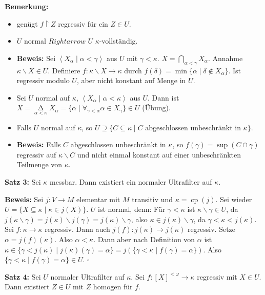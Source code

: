 \documentclass[a4paper,fontsize=11pt]{scrartcl}
\DeclareMathOperator*{\bigdelta}{\Delta}
\newcommand{\cp}{\operatorname{cp}}
\begin{document}
{\bf Bemerkung:}
\begin{itemize}
  \item[(1)] genügt $f\upharpoonright Z$ regressiv für ein $Z\in U$.
  \item[(2)] $U$ normal $Rightarrow$ $U$ $\kappa$-vollständig.
  \item[] {\bf Beweis:} Sei $\left<X_\alpha\mid\alpha<\gamma\right>$
    aus $U$ mit
    $\gamma<\kappa$. $X=\bigcap_{\alpha<\gamma}X_\alpha$. Annahme
    $\kappa\backslash X\in U$. Definiere $f:\kappa\backslash
    X\rightarrow\kappa$ durch $f(\delta)=\min\{\alpha\mid\delta\not\in
    X_\alpha\}$. Ist regressiv modulo $U$, aber nicht konstant auf
    Menge in $U$.
  \item[(3)] Sei $U$ normal auf $\kappa$,
    $\left<X_\alpha\mid\alpha<\kappa\right>$ aus $U$. Dann ist
    $X=\bigdelta\limits_{\alpha<\kappa}X_\alpha=\{\alpha\mid\forall_{\gamma<\alpha}
    \alpha\in X_\gamma\} \in U$ (Übung).
  \item[(4)] Falls $U$ normal auf $\kappa$, so
    $U\supseteq\{C\subseteq\kappa\mid C\mbox{ abgeschlossen
    unbeschränkt in }\kappa\}$.
  \item[] {\bf Beweis:} Falls $C$ abgeschlossen unbeschränkt in
    $\kappa$, so $f(\gamma)=\sup(C\cap\gamma)$ regressiv auf
    $\kappa\backslash C$ und nicht einmal konstant auf einer
    unbeschränkten Teilmenge von $\kappa$.
\end{itemize}

{\bf Satz 3:} Sei $\kappa$ messbar. Dann existiert ein normaler
Ultrafilter auf $\kappa$.

{\bf Beweis:} Sei $j:V\rightarrow M$ elementar mit $M$ transitiv und
$\kappa=\cp(j)$. Sei wieder $U=\{X\subseteq\kappa\mid\kappa\in
j(X)\}$. $U$ ist normal, denn: Für $\gamma<\kappa$ ist
$\kappa\backslash\gamma\in U$, da
$j(\kappa\backslash\gamma)=j(\kappa)\backslash
j(\gamma)=j(\kappa)\backslash\gamma$, also $\kappa\in
j(\kappa)\backslash\gamma$, da $\gamma<\kappa<j(\kappa)$. Sei
$f:\kappa\rightarrow\kappa$ regressiv. Dann auch
$j(f):j(\kappa)\rightarrow j(\kappa)$ regressiv. Setze
$\alpha=j(f)(\kappa)$. Also $\alpha<\kappa$. Dann aber nach Definition
von $\alpha$ ist $\kappa\in\{\gamma<j(\kappa)\mid
j(\kappa)(\gamma)=\alpha\} = j(\{\gamma<\kappa\mid
f(\gamma)=\alpha\})$. Also $\{\gamma<\kappa\mid f(\gamma)=\alpha\}\in
U$. \hfill $\square$


{\bf Satz 4:}
	Sei $U$ normaler Ultrafilter auf $\kappa$. 
	Sei $f\colon [X]^{<\omega}\to\kappa$ regressiv mit $X\in U$.
	Dann existiert $Z\in U$ mit $Z$ homogen für $f$.
	
\end{document}
